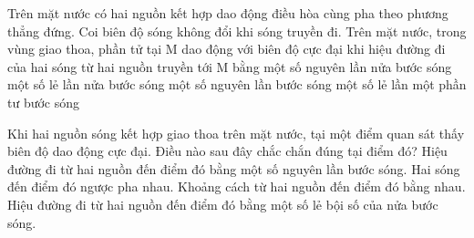 \begin{ex}%
Trên mặt nước có hai nguồn kết hợp dao động điều hòa cùng pha theo phương thẳng đứng. Coi biên độ sóng không đổi khi sóng truyền đi. Trên mặt nước, trong vùng giao thoa, phần tử tại M dao động với biên độ cực đại khi hiệu đường đi của hai sóng từ hai nguồn truyền tới M bằng
\choice
{một số nguyên lần nửa bước sóng}
{một số lẻ lần nửa bước sóng}
{\True một số nguyên lần bước sóng}
{một số lẻ lần một phần tư bước sóng}
\end{ex} 
\begin{ex}
Khi hai nguồn sóng kết hợp giao thoa trên mặt nước, tại một điểm quan sát thấy biên độ dao động cực đại. Điều nào sau đây chắc chắn đúng tại điểm đó?
\choice
{\True Hiệu đường đi từ hai nguồn đến điểm đó bằng một số nguyên lần bước sóng.}
{Hai sóng đến điểm đó ngược pha nhau.}
{Khoảng cách từ hai nguồn đến điểm đó bằng nhau.}
{Hiệu đường đi từ hai nguồn đến điểm đó bằng một số lẻ bội số của nửa bước sóng.}
\end{ex}

